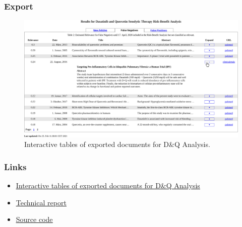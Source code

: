 \documentclass[10pt, xcolor={dvipsnames}]{beamer}
\begin{document}
\begin{frame}
\frametitle{Export}
\begin{figure}
\centering
\includegraphics[width=1\textwidth]{../report/tables/export-tables/export-tables-crop.pdf}
\caption{Interactive tables of exported documents for D\&Q Analysis.}
\label{fig:export}
\end{figure}
\end{frame}

\begin{frame}
\frametitle{Links}
\begin{itemize}
\item \underline{\href{https://markolalovic.com/longevity-research-screening/}{Interactive tables of exported documents for D\&Q Analysis}}
\item \underline{\href{https://zenodo.org/record/4603365/files/zenodo.4603365.pdf}{Technical report}}
\item \underline{\href{https://github.com/markolalovic/longevity-research-screening/}{Source code}}
\end{itemize}
\end{frame}
\end{document}
